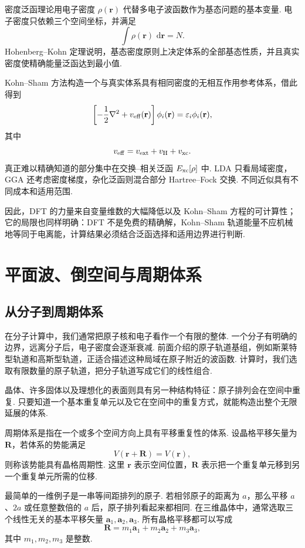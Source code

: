 \documentclass[UTF8,11pt,a4paper,openany]{ctexbook}
\newcommand{\dd}{\,\mathrm d}\newcommand{\Ham}{\hat H}\newcommand{\tr}{\operatorname{Tr}}
\begin{document}
密度泛函理论用电子密度 $\rho(\mathbf r)$ 代替多电子波函数作为基态问题的基本变量. 电子密度只依赖三个空间坐标，并满足
\[
\int\rho(\mathbf r)\,\dd\mathbf r=N.
\]
Hohenberg--Kohn 定理说明，基态密度原则上决定体系的全部基态性质，并且真实密度使精确能量泛函达到最小值. 

Kohn--Sham 方法构造一个与真实体系具有相同密度的无相互作用参考体系，借此得到
\[
\left[-\frac12\nabla^2+v_{\rm eff}(\mathbf r)\right]\phi_i(\mathbf r)
=
\varepsilon_i\phi_i(\mathbf r),
\]
其中
\[
v_{\rm eff}
=
v_{\rm ext}+v_{\rm H}+v_{\rm xc}.
\]
真正难以精确知道的部分集中在交换--相关泛函 $E_{\rm xc}[\rho]$ 中. LDA 只看局域密度，GGA 还考虑密度梯度，杂化泛函则混合部分 Hartree--Fock 交换. 不同近似具有不同成本和适用范围. 

因此，DFT 的力量来自变量维数的大幅降低以及 Kohn--Sham 方程的可计算性；它的局限也同样明确：DFT 不是免费的精确解，Kohn--Sham 轨道能量不应机械地等同于电离能，计算结果必须结合泛函选择和适用边界进行判断. 
\chapter{平面波、倒空间与周期体系}

\section{从分子到周期体系}

在分子计算中，我们通常把原子核和电子看作一个有限的整体. 一个分子有明确的边界，远离分子后，电子密度会逐渐衰减. 前面介绍的原子轨道基组，例如斯莱特型轨道和高斯型轨道，正适合描述这种局域在原子附近的波函数. 计算时，我们选取有限数量的原子轨道，把分子轨道写成它们的线性组合. 

晶体、许多固体以及理想化的表面则具有另一种结构特征：原子排列会在空间中重复. 只要知道一个基本重复单元以及它在空间中的重复方式，就能构造出整个无限延展的体系. 

\begin{definitionbox}
周期体系是指在一个或多个空间方向上具有平移重复性的体系. 设晶格平移矢量为 $\mathbf R$，若体系的势能满足
\[
V(\mathbf r+\mathbf R)=V(\mathbf r),
\]
则称该势能具有晶格周期性. 这里 $\mathbf r$ 表示空间位置，$\mathbf R$ 表示把一个重复单元移到另一个重复单元所需的位移. 
\end{definitionbox}

最简单的一维例子是一串等间距排列的原子. 若相邻原子的距离为 $a$，那么平移 $a$、$2a$ 或任意整数倍的 $a$ 后，原子排列看起来都相同. 在三维晶体中，通常选取三个线性无关的基本平移矢量 $\mathbf a_1,\mathbf a_2,\mathbf a_3$. 所有晶格平移都可以写成
\[
\mathbf R=m_1\mathbf a_1+m_2\mathbf a_2+m_3\mathbf a_3,
\]
其中 $m_1,m_2,m_3$ 是整数. 
\end{document}

